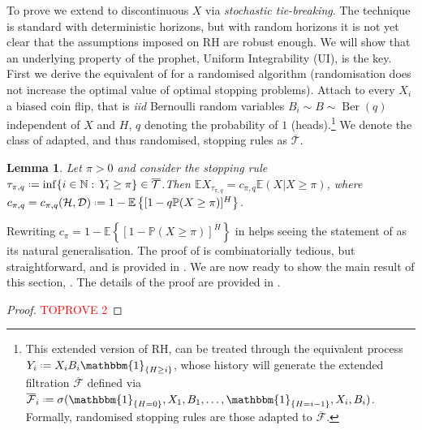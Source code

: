 \documentclass[11pt, a4paper, twoside]{article}
\newcommand*{\defeq}{\mathrel{\vcenter{\baselineskip0.5ex \lineskiplimit0pt
			\hbox{\scriptsize.}\hbox{\scriptsize.}}}=}
\newcommand{\NN}{\mathbb{N}}
\newcommand{\EE}{\mathbb{E}}
\newcommand{\PP}{\mathbb{P}}
\newcommand{\BT}{\overline{\mathcal{T}}}
\newcommand{\BF}{\overline{\mathcal{F}}}
\newcommand{\HH}{\mathcal{H}}
\newcommand{\DD}{\mathcal{D}}
\newcommand{\II}{\mathbbm{1}}
\DeclareMathOperator{\Ber}{Ber}
\newtheorem{lemma}{Lemma}[section]
\numberwithin{equation}{section}
\begin{document}
	To prove  we extend  to discontinuous $X$ via \textit{stochastic tie-breaking}. The technique is standard with deterministic horizons, but with random horizons it is not yet clear that the assumptions imposed on RH are robust enough. We will show that an underlying property of the prophet, Uniform Integrability (UI), is the key. First we derive the equivalent of  for a randomised algorithm (randomisation does not increase the optimal value of optimal stopping problems). Attach to every $X_i$ a biased coin flip, that is \textit{iid} Bernoulli random variables $B_i\sim B\sim\Ber(q)$ independent of $X$ and $H$, $q$ denoting the probability of $1$ (heads).\footnote{This extended version of RH, can be treated through the equivalent process $Y_i\defeq X_iB_i\II_{\{H\ge i\}}$, whose history will generate the extended filtration $\BF$ defined via $\BF_i\defeq\sigma(\II_{\{H=0\}},X_1,B_1,\ldots,\II_{\{H=i-1\}},X_i,B_i)$. Formally, randomised stopping rules are those adapted to $\BF$.} We denote the class of adapted, and thus randomised, stopping rules as $\BT$.
	\begin{lemma}\label{algran}
		Let $\pi>0$ and consider the stopping rule $\tau_{\pi,q}\defeq\inf\{i\in\NN:\,Y_i\ge \pi\}\in\BT$.Then $\EE X_{\tau_{\pi,q}}= c_{\pi,q}\EE(X|X\ge \pi)$, where $c_{\pi,q}=c_{\pi,q}(\HH,\DD)\defeq 1-\EE\left\lbrace[1-q\PP(X\ge \pi)]^H\right\rbrace$.
	\end{lemma}
	Rewriting $c_\pi=1-\EE\left\lbrace [1-\PP(X\ge\pi)]^H\right\rbrace$ in  helps seeing the statement of  as its natural generalisation. The proof of  is combinatorially tedious, but straightforward, and is provided in . We are now ready to show the main result of this section, . The details of the proof are provided in .
    \begin{proof}\textcolor{red}{TOPROVE 2}\end{proof}
	
\end{document}
